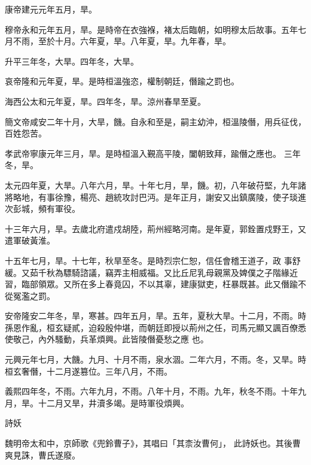 \begin{pinyinscope}
 康帝建元元年五月，旱。



 穆帝永和元年五月，旱。是時帝在衣強褓，褚太后臨朝，如明穆太后故事。五年七月不雨，至於十月。六年夏，旱。八年夏，旱。九年春，旱。



 升平三年冬，大旱。四年冬，大旱。



 哀帝隆和元年夏，旱。是時桓溫強恣，權制朝廷，僭踰之罰也。



 海西公太和元年夏，旱。四年冬，旱。涼州春旱至夏。



 簡文帝咸安二年十月，大旱，饑。自永和至是，嗣主幼沖，桓溫陵僭，用兵征伐，百姓怨苦。



 孝武帝寧康元年三月，旱。是時桓溫入覲高平陵，闔朝致拜，踰僭之應也。
 三年冬，旱。



 太元四年夏，大旱。八年六月，旱。十年七月，旱，饑。初，八年破苻堅，九年諸將略地，有事徐豫，楊亮、趙統攻討巴沔。是年正月，謝安又出鎮廣陵，使子琰進次彭城，頻有軍役。



 十三年六月，旱。去歲北府遣戍胡陸，荊州經略河南。是年夏，郭銓置戍野王，又遣軍破黃淮。



 十五年七月，旱。十七年，秋旱至冬。是時烈宗仁恕，信任會稽王道子，政
 事舒緩。又茹千秋為驃騎諮議，竊弄主相威福。又比丘尼乳母親黨及婢僕之子階緣近習，臨部領眾。又所在多上春竟囚，不以其辜，建康獄吏，枉暴既甚。此又僭踰不從冤濫之罰。



 安帝隆安二年冬，旱，寒甚。四年五月，旱。五年，夏秋大旱。十二月，不雨。時孫恩作亂，桓玄疑貳，迫殺殷仲堪，而朝廷即授以荊州之任，司馬元顯又諷百僚悉使敬己，內外騷動，兵革煩興。此皆陵僭憂愁之應
 也。



 元興元年七月，大饑。九月、十月不雨，泉水涸。二年六月，不雨。冬，又旱。時桓玄奢僭，十二月遂篡位。三年八月，不雨。



 義熙四年冬，不雨。六年九月，不雨。八年十月，不雨。九年，秋冬不雨。十年九月，旱。十二月又旱，井瀆多竭。是時軍役煩興。



 詩妖



 魏明帝太和中，京師歌《兜鈴曹子》，其唱曰「其柰汝曹何」，
 此詩妖也。其後曹爽見誅，曹氏遂廢。




\end{pinyinscope}
